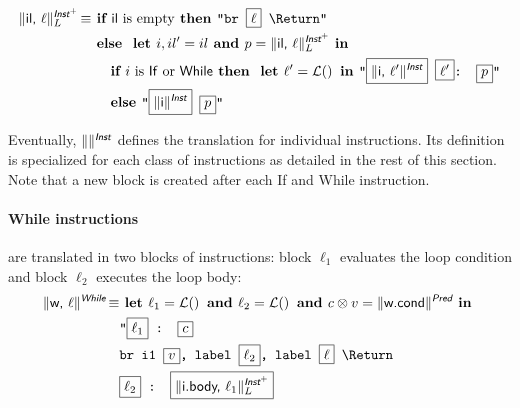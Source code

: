 \documentclass{llncs}
\newcommand{\trad}[2]{\ensuremath{\lVert \textsf{#1} \rVert^{\textit{#2}}}}
\newcommand{\nl}[0]{\text{\Return}}
\DeclareMathOperator{\isdef}{\equiv}
\DeclareMathOperator{\name}{\mathcal{L}()}
\newcommand{\llvm}[1]{\texttt{#1}}
\newcommand{\B}[1]{\textsf{#1}}
\newcommand{\ListOf}[1]{$\mbox{#1}^+$}
\newcommand{\IF}[0]{\textbf{ if }}
\newcommand{\ELSE}[0]{\textbf{ else }}
\newcommand{\THEN}[0]{\textbf{ then }}
\newcommand{\LET}[0]{\textbf{ let }}
\newcommand{\IN}[0]{\textbf{ in }}
\newcommand{\AND}[0]{\textbf{ and }}
\newcommand{\PH}[1]{\framebox{$#1$}}
\newcommand{\sep}[0]{\otimes}
\begin{document}
\begin{align*}
\trad{\B{il}, $\ell$}{\ListOf{\B{Inst}}}_L \isdef & \IF \B{il} \mbox{ is empty} \THEN \llvm{"br \PH{\ell} \nl"} \\
& \ELSE \LET i, il' = il  \AND p = \trad{il, $\ell$}{\ListOf{\B{Inst}}}_L \IN \\
& \quad \IF i \mbox{ is \B{If} or \B{While}} \THEN \LET \ell' = \name \IN \llvm{"\PH{\trad{i, $\ell'$}{\B{Inst}}} \PH{\ell'}: \PH{p}"} \\
& \quad \ELSE \llvm{"\PH{\trad{i}{\B{Inst}}} \PH{p}"}
\end{align*}

Eventually, $\trad{}{\B{Inst}}$ defines the translation for individual
instructions. Its definition is specialized for each class of instructions as
detailed in the rest of this section. Note that a new block is created after
each \B{If} and \B{While} instruction.

\paragraph{While instructions} are translated in two blocks of instructions:
block $\ell_1$ evaluates the loop condition and block $\ell_2$ executes the loop
body:
\begin{align*}
\begin{split}
\trad{w, $\ell$}{\B{While}} \isdef 
  & \LET \ell_1 = \name \AND \ell_2 = \name \AND c \sep v = \trad{w.cond}{\B{Pred}} \IN \\
  & \llvm{"\PH{\ell_1} : \PH{c}} \\
  & \llvm{br i1 \PH{v}, label \PH{\ell_2}, label \PH{\ell} \nl} \\
  & \llvm{\PH{\ell_2} : \PH{\trad{i.body, $\ell_1$}{\ListOf{\B{Inst}}}_L}}
\end{split}
\end{align*}
\end{document}
